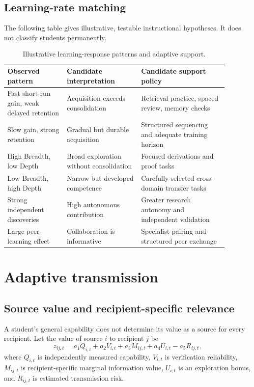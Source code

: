 \documentclass[11pt,a4paper]{article}
\begin{document}
\subsection{Learning-rate matching}

The following table gives illustrative, testable instructional hypotheses. It does not classify students permanently.

\begin{table}[ht]
\centering
\small
\begin{tabular}{p{0.24\linewidth}p{0.30\linewidth}p{0.35\linewidth}}
\toprule
Observed pattern & Candidate interpretation & Candidate support policy\\
\midrule
Fast short-run gain, weak delayed retention & Acquisition exceeds consolidation & Retrieval practice, spaced review, memory checks\\
Slow gain, strong retention & Gradual but durable acquisition & Structured sequencing and adequate training horizon\\
High Breadth, low Depth & Broad exploration without consolidation & Focused derivations and proof tasks\\
Low Breadth, high Depth & Narrow but developed competence & Carefully selected cross-domain transfer tasks\\
Strong independent discoveries & High autonomous contribution & Greater research autonomy and independent validation\\
Large peer-learning effect & Collaboration is informative & Specialist pairing and structured peer exchange\\
\bottomrule
\end{tabular}
\caption{Illustrative learning-response patterns and adaptive support.}
\end{table}

\section{Adaptive transmission}

\subsection{Source value and recipient-specific relevance}

A student's general capability does not determine its value as a source for every recipient. Let the value of source \(i\) to recipient \(j\) be
\begin{equation}
z_{ij,t}
=
a_1Q_{i,t}
+a_2V_{i,t}
+a_3M_{ij,t}
+a_4U_{i,t}
-a_5R_{ij,t},
\end{equation}
where \(Q_{i,t}\) is independently measured capability, \(V_{i,t}\) is verification reliability, \(M_{ij,t}\) is recipient-specific marginal information value, \(U_{i,t}\) is an exploration bonus, and \(R_{ij,t}\) is estimated transmission risk.
\end{document}
